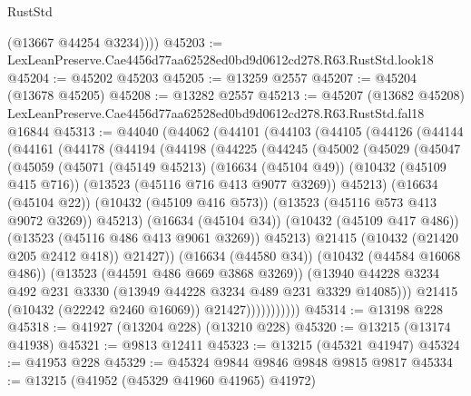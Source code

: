 \begin{lexlean}{RustStd}
\begin{coremodule}
          (@13667 @44254 @3234))))
@45203 := LexLeanPreserve.Cae4456d77aa62528ed0bd9d0612cd278.R63.RustStd.look18
@45204 := @45202 @45203
@45205 := @13259 @2557
@45207 := @45204 (@13678 @45205)
@45208 := @13282 @2557
@45213 := @45207
    (@13682 @45208)
    LexLeanPreserve.Cae4456d77aa62528ed0bd9d0612cd278.R63.RustStd.fal18
    @16844
@45313 := @44040
    (@44062
      (@44101
        (@44103
          (@44105
            (@44126
              (@44144
                (@44161
                  (@44178
                    (@44194
                      (@44198
                        (@44225
                          (@44245
                            (@45002
                              (@45029
                                (@45047
                                  (@45059
                                    (@45071
                                      (@45149 @45213)
                                      (@16634 (@45104 @49))
                                      (@10432 (@45109 @415 @716))
                                      (@13523 (@45116 @716 @413 @9077 @3269))
                                      @45213)
                                    (@16634 (@45104 @22))
                                    (@10432 (@45109 @416 @573))
                                    (@13523 (@45116 @573 @413 @9072 @3269))
                                    @45213)
                                  (@16634 (@45104 @34))
                                  (@10432 (@45109 @417 @486))
                                  (@13523 (@45116 @486 @413 @9061 @3269))
                                  @45213)
                                @21415
                                (@10432 (@21420 @205 @2412 @418))
                                @21427))
                            (@16634 (@44580 @34))
                            (@10432 (@44584 @16068 @486))
                            (@13523 (@44591 @486 @669 @3868 @3269))
                            (@13940
                              @44228
                              @3234
                              @492
                              @231
                              @3330
                              (@13949 @44228 @3234 @489 @231 @3329 @14085)))
                          @21415
                          (@10432 (@22242 @2460 @16069))
                          @21427)))))))))))
@45314 := @13198 @228
@45318 := @41927 (@13204 @228) (@13210 @228)
@45320 := @13215 (@13174 @41938)
@45321 := @9813 @12411
@45323 := @13215 (@45321 @41947)
@45324 := @41953 @228
@45329 := @45324 @9844 @9846 @9848 @9815 @9817
@45334 := @13215 (@41952 (@45329 @41960 @41965) @41972)

\end{coremodule}
\end{lexlean}
